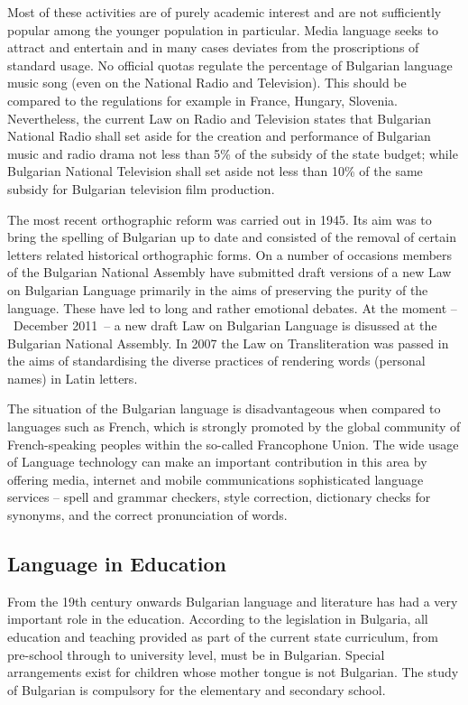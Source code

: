 \begin{multicols}{2}
  Most of these activities are of purely academic interest and are not sufficiently popular among the younger population in particular. Media language seeks to attract and entertain and in many cases deviates from the proscriptions of standard usage. No official quotas regulate the percentage of Bulgarian language music song (even on the National Radio and Television). This should be compared to the regulations for example in France, Hungary, Slovenia. Nevertheless, the current Law on Radio and Television states that Bulgarian National Radio shall set aside for the creation and performance of Bulgarian music and radio drama not less than 5\% of the subsidy of the state budget; while Bulgarian National Television shall set aside not less than 10\% of the same subsidy for Bulgarian television film production. 

  The most recent orthographic reform was carried out in 1945. Its aim was to bring the spelling of Bulgarian up to date and consisted of the removal of certain letters related historical orthographic forms. On a number of occasions members of the Bulgarian National Assembly have submitted draft versions of a new Law on Bulgarian Language primarily in the aims of preserving the purity of the language. These have led to long and rather emotional debates. At the moment --~December 2011~-- a new draft Law on Bulgarian Language is disussed at the Bulgarian National Assembly.  In 2007 the Law on Transliteration was passed in the aims of standardising the diverse practices of rendering words (personal names) in Latin letters.

  The situation of the Bulgarian language is disadvantageous when compared to languages such as French, which is strongly promoted by the global community of French-speaking peoples within the so-called Francophone Union. The wide usage of Language technology can make an important contribution in this area by offering media, internet and mobile communications sophisticated language services -- spell and grammar checkers, style correction, dictionary checks for synonyms, and the correct pronunciation of words.

  \subsection{Language in Education}

  From the 19th century onwards Bulgarian language and literature has had a very important role in the education. According to the legislation in Bulgaria, all education and teaching provided as part of the current state curriculum, from pre-school through to university level, must be in Bulgarian. Special arrangements exist for children whose mother tongue is not Bulgarian. The study of Bulgarian is compulsory for the elementary and secondary school.


\end{multicols}
